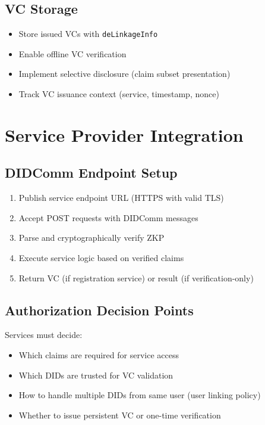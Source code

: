 \subsection{VC Storage}

\begin{itemize}
  \item Store issued VCs with \texttt{deLinkageInfo}
  \item Enable offline VC verification
  \item Implement selective disclosure (claim subset presentation)
  \item Track VC issuance context (service, timestamp, nonce)
\end{itemize}

\section{Service Provider Integration}

\subsection{DIDComm Endpoint Setup}

\begin{enumerate}
  \item Publish service endpoint URL (HTTPS with valid TLS)
  \item Accept POST requests with DIDComm messages
  \item Parse and cryptographically verify ZKP
  \item Execute service logic based on verified claims
  \item Return VC (if registration service) or result (if verification-only)
\end{enumerate}

\subsection{Authorization Decision Points}

Services must decide:

\begin{itemize}
  \item Which claims are required for service access
  \item Which DIDs are trusted for VC validation
  \item How to handle multiple DIDs from same user (user linking policy)
  \item Whether to issue persistent VC or one-time verification
\end{itemize}

